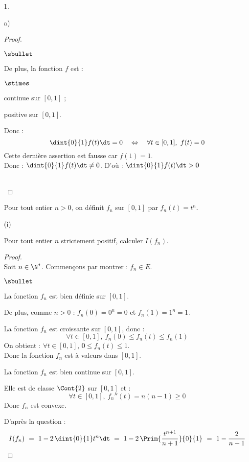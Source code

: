 \documentclass[11pt]{article}%
\begin{document}
\begin{noliste}{1.}
\begin{noliste}{a)}
\begin{proof}
\begin{noliste}{$\sbullet$}
      \item De plus, la fonction $f$ est :
      \begin{noliste}{$\stimes$}
	\item continue sur $[0,1]$ ;
	\item positive sur $[0,1]$.
      \end{noliste}
      Donc :
      \[
        \dint{0}{1} f(t) \dt = 0 \quad \Leftrightarrow \quad 
        \forall t \in [0,1], \ f(t)=0
      \]
      Cette dernière assertion est fausse car $f(1)=1$.\\
      Donc : $\dint{0}{1} f(t) \dt \neq 0$. D'où : 
      $\dint{0}{1} f(t) \dt >0$
    \end{noliste}
    ~\\[-1cm]
  \end{proof}

  
  \item Pour tout entier $n >0$, on définit $f_n$ sur $[0,1]$ par 
  $f_n(t)=t^n$.
  \begin{nonoliste}{(i)}
    \item Pour tout entier $n$ strictement positif, calculer $I(f_n)$.
    
    \begin{proof}~\\
    Soit $n\in \N^*$.
	Commençons par montrer : $f_n \in E$.
	\begin{noliste}{$\sbullet$}
	  \item La fonction $f_n$ est bien définie sur $[0,1]$.
	  \item De plus, comme $n>0$ : $f_n(0)=0^n=0$ et $f_n(1)=1^n=1$.
	  
	  \item La fonction $f_n$ est croissante sur $[0,1]$, donc :
	  \[
	    \forall t\in [0,1], \ f_n(0) \leq f_n(t) \leq f_n(1)
	  \]
	  On obtient : $\forall t\in [0,1]$, $0 \leq f_n(t) \leq 
	  1$.\\
	  Donc la fonction $f_n$ est à valeurs dans $[0,1]$.
	  \item La fonction $f_n$ est bien continue sur $[0,1]$.
	  \item Elle est de classe $\Cont{2}$ sur $[0,1]$ et :
	  \[
	    \forall t \in [0,1], \ f_n''(t)=n(n-1)\geq 0
	  \]
	  Donc $f_n$ est convexe.
	\end{noliste}
	
	
	\newpage
	
	
      D'après la question  :
      \[
        I(f_n) \ = \ 1-2\, \dint{0}{1} t^n \dt \ = \ 1- 2 \, \Prim{
        \dfrac{t^{n+1}}{n+1}}{0}{1} \ = \ 1 - \dfrac{2}{n+1}
      \]
      

\end{proof}
\end{nonoliste}
\end{noliste}
\end{noliste}
\end{document}
